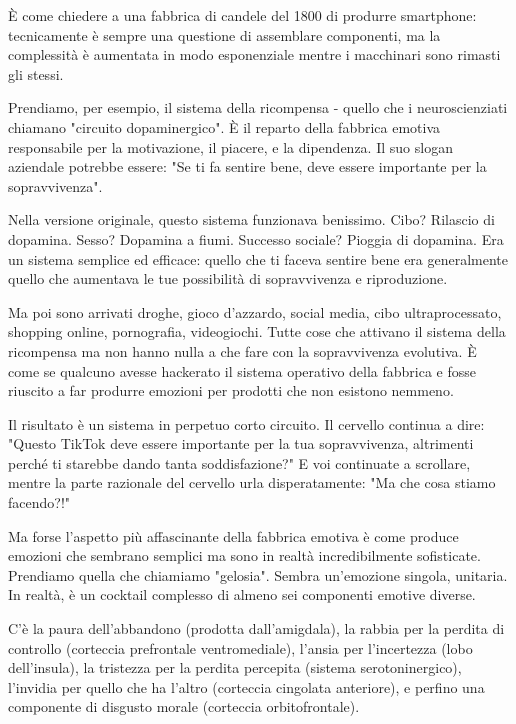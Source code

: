 È come chiedere a una fabbrica di candele del 1800 di produrre smartphone: tecnicamente è sempre una questione di assemblare componenti, ma la complessità è aumentata in modo esponenziale mentre i macchinari sono rimasti gli stessi.

\medskip

Prendiamo, per esempio, il sistema della ricompensa - quello che i neuroscienziati chiamano "circuito dopaminergico". È il reparto della fabbrica emotiva responsabile per la motivazione, il piacere, e la dipendenza. Il suo slogan aziendale potrebbe essere: "Se ti fa sentire bene, deve essere importante per la sopravvivenza".

Nella versione originale, questo sistema funzionava benissimo. Cibo? Rilascio di dopamina. Sesso? Dopamina a fiumi. Successo sociale? Pioggia di dopamina. Era un sistema semplice ed efficace: quello che ti faceva sentire bene era generalmente quello che aumentava le tue possibilità di sopravvivenza e riproduzione.

Ma poi sono arrivati droghe, gioco d'azzardo, social media, cibo ultraprocessato, shopping online, pornografia, videogiochi. Tutte cose che attivano il sistema della ricompensa ma non hanno nulla a che fare con la sopravvivenza evolutiva. È come se qualcuno avesse hackerato il sistema operativo della fabbrica e fosse riuscito a far produrre emozioni per prodotti che non esistono nemmeno.

Il risultato è un sistema in perpetuo corto circuito. Il cervello continua a dire: "Questo TikTok deve essere importante per la tua sopravvivenza, altrimenti perché ti starebbe dando tanta soddisfazione?" E voi continuate a scrollare, mentre la parte razionale del cervello urla disperatamente: "Ma che cosa stiamo facendo?!"

\bigskip

Ma forse l'aspetto più affascinante della fabbrica emotiva è come produce emozioni che sembrano semplici ma sono in realtà incredibilmente sofisticate. Prendiamo quella che chiamiamo "gelosia". Sembra un'emozione singola, unitaria. In realtà, è un cocktail complesso di almeno sei componenti emotive diverse.

C'è la paura dell'abbandono (prodotta dall'amigdala), la rabbia per la perdita di controllo (corteccia prefrontale ventromediale), l'ansia per l'incertezza (lobo dell'insula), la tristezza per la perdita percepita (sistema serotoninergico), l'invidia per quello che ha l'altro (corteccia cingolata anteriore), e perfino una componente di disgusto morale (corteccia orbitofrontale).

